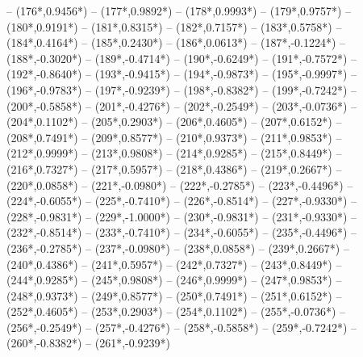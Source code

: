 {		-- ({176*\dx},{0.9456*\dy})
		-- ({177*\dx},{0.9892*\dy})
		-- ({178*\dx},{0.9993*\dy})
		-- ({179*\dx},{0.9757*\dy})
		-- ({180*\dx},{0.9191*\dy})
		-- ({181*\dx},{0.8315*\dy})
		-- ({182*\dx},{0.7157*\dy})
		-- ({183*\dx},{0.5758*\dy})
		-- ({184*\dx},{0.4164*\dy})
		-- ({185*\dx},{0.2430*\dy})
		-- ({186*\dx},{0.0613*\dy})
		-- ({187*\dx},{-0.1224*\dy})
		-- ({188*\dx},{-0.3020*\dy})
		-- ({189*\dx},{-0.4714*\dy})
		-- ({190*\dx},{-0.6249*\dy})
		-- ({191*\dx},{-0.7572*\dy})
		-- ({192*\dx},{-0.8640*\dy})
		-- ({193*\dx},{-0.9415*\dy})
		-- ({194*\dx},{-0.9873*\dy})
		-- ({195*\dx},{-0.9997*\dy})
		-- ({196*\dx},{-0.9783*\dy})
		-- ({197*\dx},{-0.9239*\dy})
		-- ({198*\dx},{-0.8382*\dy})
		-- ({199*\dx},{-0.7242*\dy})
		-- ({200*\dx},{-0.5858*\dy})
		-- ({201*\dx},{-0.4276*\dy})
		-- ({202*\dx},{-0.2549*\dy})
		-- ({203*\dx},{-0.0736*\dy})
		-- ({204*\dx},{0.1102*\dy})
		-- ({205*\dx},{0.2903*\dy})
		-- ({206*\dx},{0.4605*\dy})
		-- ({207*\dx},{0.6152*\dy})
		-- ({208*\dx},{0.7491*\dy})
		-- ({209*\dx},{0.8577*\dy})
		-- ({210*\dx},{0.9373*\dy})
		-- ({211*\dx},{0.9853*\dy})
		-- ({212*\dx},{0.9999*\dy})
		-- ({213*\dx},{0.9808*\dy})
		-- ({214*\dx},{0.9285*\dy})
		-- ({215*\dx},{0.8449*\dy})
		-- ({216*\dx},{0.7327*\dy})
		-- ({217*\dx},{0.5957*\dy})
		-- ({218*\dx},{0.4386*\dy})
		-- ({219*\dx},{0.2667*\dy})
		-- ({220*\dx},{0.0858*\dy})
		-- ({221*\dx},{-0.0980*\dy})
		-- ({222*\dx},{-0.2785*\dy})
		-- ({223*\dx},{-0.4496*\dy})
		-- ({224*\dx},{-0.6055*\dy})
		-- ({225*\dx},{-0.7410*\dy})
		-- ({226*\dx},{-0.8514*\dy})
		-- ({227*\dx},{-0.9330*\dy})
		-- ({228*\dx},{-0.9831*\dy})
		-- ({229*\dx},{-1.0000*\dy})
		-- ({230*\dx},{-0.9831*\dy})
		-- ({231*\dx},{-0.9330*\dy})
		-- ({232*\dx},{-0.8514*\dy})
		-- ({233*\dx},{-0.7410*\dy})
		-- ({234*\dx},{-0.6055*\dy})
		-- ({235*\dx},{-0.4496*\dy})
		-- ({236*\dx},{-0.2785*\dy})
		-- ({237*\dx},{-0.0980*\dy})
		-- ({238*\dx},{0.0858*\dy})
		-- ({239*\dx},{0.2667*\dy})
		-- ({240*\dx},{0.4386*\dy})
		-- ({241*\dx},{0.5957*\dy})
		-- ({242*\dx},{0.7327*\dy})
		-- ({243*\dx},{0.8449*\dy})
		-- ({244*\dx},{0.9285*\dy})
		-- ({245*\dx},{0.9808*\dy})
		-- ({246*\dx},{0.9999*\dy})
		-- ({247*\dx},{0.9853*\dy})
		-- ({248*\dx},{0.9373*\dy})
		-- ({249*\dx},{0.8577*\dy})
		-- ({250*\dx},{0.7491*\dy})
		-- ({251*\dx},{0.6152*\dy})
		-- ({252*\dx},{0.4605*\dy})
		-- ({253*\dx},{0.2903*\dy})
		-- ({254*\dx},{0.1102*\dy})
		-- ({255*\dx},{-0.0736*\dy})
		-- ({256*\dx},{-0.2549*\dy})
		-- ({257*\dx},{-0.4276*\dy})
		-- ({258*\dx},{-0.5858*\dy})
		-- ({259*\dx},{-0.7242*\dy})
		-- ({260*\dx},{-0.8382*\dy})
		-- ({261*\dx},{-0.9239*\dy})
}
